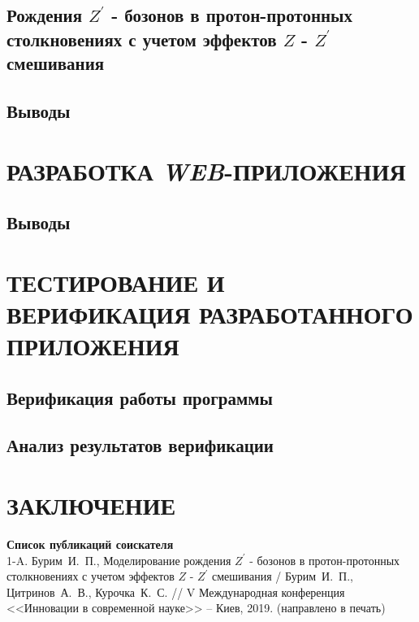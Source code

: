 \documentclass[12pt,a4paper]{styles/report}
\begin{document}
\section{Рождения $Z^\prime$ - бозонов в протон-протонных столкновениях с учетом эффектов $Z$ - $Z^\prime$ смешивания}


\section{Выводы}



\chapter{РАЗРАБОТКА \textit{WEB}-ПРИЛОЖЕНИЯ}

\section{Выводы}


\chapter{ТЕСТИРОВАНИЕ И ВЕРИФИКАЦИЯ РАЗРАБОТАННОГО ПРИЛОЖЕНИЯ}
\section{Верификация работы программы}

\section{Анализ результатов верификации}


\newpage
\chapter*{ЗАКЛЮЧЕНИЕ}


\newpage
{}
\begin{thebibliography}{9999.}

\end{thebibliography}

\textbf{Список публикаций соискателя}\\

1-A. Бурим~И.~П., Моделирование рождения $Z^\prime$ - бозонов в протон-протонных столкновениях с учетом эффектов $Z$ - $Z^\prime$ смешивания / Бурим~И.~П., Цитринов~А.~В., Курочка~К.~С. // V Международная конференция <<Инновации в современной науке>> -- Киев, 2019. (направлено в печать)


\newpage

\end{document}
